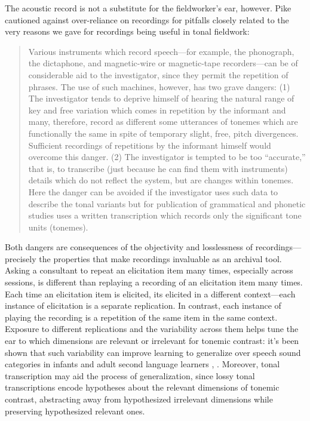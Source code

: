 \documentclass[12pt]{article}
\begin{document}
 
The acoustic record is not a substitute for the fieldworker's ear,
however. Pike cautioned against over-reliance on recordings for
pitfalls closely related to the very reasons we gave for recordings being useful in
tonal fieldwork:

\begin{quote}
  \textsf{\small{Various instruments which record speech---for example, the phonograph,
  the dictaphone, and magnetic-wire or magnetic-tape recorders---can be
  of considerable aid to the investigator, since they permit the
  repetition of phrases. The use of such machines, however, has two
  grave dangers: 
  \hfill\break
  (1) The investigator tends to deprive himself of hearing the
  natural range of key and free variation which comes in
  repetition by the informant and many, therefore, record as
  different some utterances of tonemes which are functionally the
  same in spite of temporary slight, free, pitch
  divergences. Sufficient recordings of repetitions by the
  informant himself would overcome this danger. 
  \hfill\break
  (2) The investigator is tempted to be too ``accurate,'' that is, to
  transcribe (just because he can find them with instruments)
  details which do not reflect the system, but are changes within
  tonemes. Here the danger can be avoided if the investigator uses
  such data to describe the tonal variants but for publication of
  grammatical and phonetic studies uses a written transcription
  which records only the significant tone units (tonemes). \citep[p.\ 44]{Pike:1948}}}
\end{quote}

Both dangers are consequences of the objectivity and losslessness of
recordings---precisely the properties that make recordings invaluable
as an archival tool. Asking a consultant to repeat an elicitation item
many times, especially across sessions, is different than replaying a recording of an elicitation
item many times. Each time an elicitation item is elicited, its
elicited in a different context---each instance of elicitation is a
separate replication. In contrast, each instance of playing the
recording is a repetition of the same item in the same
context. Exposure to different replications and the variability across
them helps tune the ear to which dimensions are relevant or irrelevant
for tonemic contrast: it's been shown that such variability can
improve learning to generalize over speech sound categories in infants
and adult second language learners \citep{Rost:2009},
\citep{Lively:1993}. Moreover, tonal transcription may aid the process
of generalization, since lossy tonal transcriptions encode hypotheses
about the relevant dimensions of tonemic contrast, abstracting away
from hypothesized irrelevant dimensions while preserving hypothesized
relevant ones.
\end{document}
